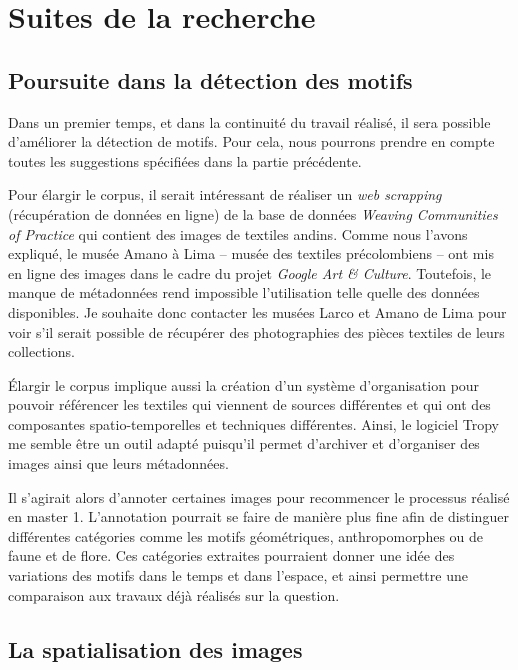 \documentclass[a4paper, twoside, 12pt]{book}
\begin{document}
\chapter{Suites de la recherche}

\section{Poursuite dans la détection des motifs}

Dans un premier temps, et dans la continuité du travail réalisé, il sera possible d'améliorer la détection de motifs. Pour cela, nous pourrons prendre en compte toutes les suggestions spécifiées dans la partie précédente. 

Pour élargir le corpus, il serait intéressant de réaliser un \textit{web scrapping} (récupération de données en ligne) de la base de données \og \textit{Weaving Communities of Practice} \fg \:qui contient des images de textiles andins. Comme nous l'avons expliqué, le musée Amano à Lima -- musée des textiles précolombiens -- ont mis en ligne des images dans le cadre du projet \textit{Google Art \& Culture}. Toutefois, le manque de métadonnées rend impossible l'utilisation telle quelle des données disponibles. Je souhaite donc contacter les musées Larco et Amano de Lima pour voir s'il serait possible de récupérer des photographies des pièces textiles de leurs collections. 

Élargir le corpus implique aussi la création d'un système d'organisation pour pouvoir référencer les textiles qui viennent de sources différentes et qui ont des composantes spatio-temporelles et techniques différentes. Ainsi, le logiciel Tropy me semble être un outil adapté puisqu'il permet d'archiver et d'organiser des images ainsi que leurs métadonnées.

Il s'agirait alors d'annoter certaines images pour recommencer le processus réalisé en master 1. L'annotation pourrait se faire de manière plus fine afin de distinguer différentes catégories comme les motifs géométriques, anthropomorphes ou de faune et de flore. Ces catégories extraites pourraient donner une idée des variations des motifs dans le temps et dans l'espace, et ainsi permettre une comparaison aux travaux déjà réalisés sur la question. 

\section{La spatialisation des images}
\end{document}
